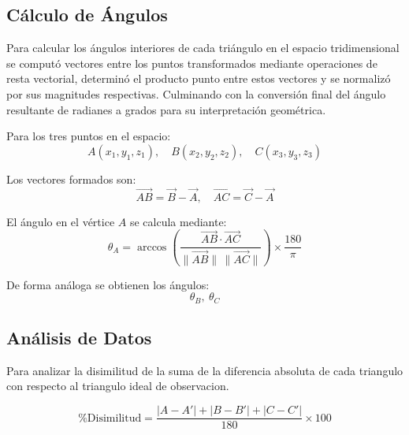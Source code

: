 \documentclass[a4paper,alpha-refs]{eSpectra}
\begin{document}

\subsection{Cálculo de Ángulos}
Para calcular los ángulos interiores de cada triángulo en el espacio tridimensional se computó vectores entre los puntos transformados mediante operaciones de resta vectorial, determinó el producto punto entre estos vectores y se normalizó por sus magnitudes respectivas.  Culminando con la conversión final del ángulo resultante de radianes a grados para su interpretación geométrica.

\smallskip

Para los tres puntos en el espacio:
\[
A(x_1, y_1, z_1), \quad B(x_2, y_2, z_2), \quad C(x_3, y_3, z_3)
\]

Los vectores formados son:
\[
\vec{AB} = \vec{B} - \vec{A}, \quad
\vec{AC} = \vec{C} - \vec{A}
\]

El ángulo en el vértice \(A\) se calcula mediante:
\[
\theta_A = \arccos \left(
\frac{ \vec{AB} \cdot \vec{AC} }{ \lVert \vec{AB} \rVert \, \lVert \vec{AC} \rVert }
\right) \times \frac{180}{\pi}
\]

De forma análoga se obtienen los ángulos:
\[
\theta_B, \ \theta_C
\]

\vspace{-\baselineskip}  %
\vspace{-0.5\baselineskip}  %

\subsection{Análisis de Datos }

Para analizar la disimilitud de la suma de la diferencia absoluta de cada triangulo con respecto al triangulo ideal de observacion. 


\begin{equation}
\% \text{Disimilitud} = 
\frac{ \left| A - A' \right| + \left| B - B' \right| + \left| C - C' \right| }{180} \times 100
\label{eq:dissimilarity}
\end{equation}
\end{document}
